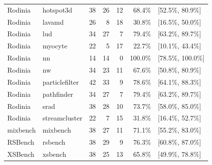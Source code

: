 \begin{table}[!htbp]
\begin{tabular}{@{}llrrrrl@{}}
Rodinia & hotspot3d & 38 & 26 & 12 & 68.4\% & [52.5\%, 80.9\%] \\
Rodinia & lavamd & 26 & 8 & 18 & 30.8\% & [16.5\%, 50.0\%] \\
Rodinia & lud & 34 & 27 & 7 & 79.4\% & [63.2\%, 89.7\%] \\
Rodinia & myocyte & 22 & 5 & 17 & 22.7\% & [10.1\%, 43.4\%] \\
Rodinia & nn & 14 & 14 & 0 & 100.0\% & [78.5\%, 100.0\%] \\
Rodinia & nw & 34 & 23 & 11 & 67.6\% & [50.8\%, 80.9\%] \\
Rodinia & particlefilter & 42 & 33 & 9 & 78.6\% & [64.1\%, 88.3\%] \\
Rodinia & pathfinder & 34 & 27 & 7 & 79.4\% & [63.2\%, 89.7\%] \\
Rodinia & srad & 38 & 28 & 10 & 73.7\% & [58.0\%, 85.0\%] \\
Rodinia & streamcluster & 22 & 7 & 15 & 31.8\% & [16.4\%, 52.7\%] \\
\midrule
mixbench & mixbench & 38 & 27 & 11 & 71.1\% & [55.2\%, 83.0\%] \\
RSBench & rsbench & 38 & 29 & 9 & 76.3\% & [60.8\%, 87.0\%] \\
XSBench & xsbench & 38 & 25 & 13 & 65.8\% & [49.9\%, 78.8\%] \\
\bottomrule
\end{tabular}
\end{table}



